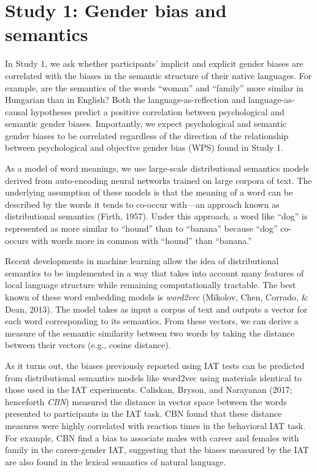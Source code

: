 \documentclass[man]{apa6}
\theoremstyle{definition}
\theoremstyle{definition}
\theoremstyle{definition}
\theoremstyle{remark}
\begin{document}
\section{Study 1: Gender bias and
semantics}\label{study-1-gender-bias-and-semantics}

In Study 1, we ask whether participants' implicit and explicit gender
biases are correlated with the biases in the semantic structure of their
native languages. For example, are the semantics of the words
\enquote{woman} and \enquote{family} more similar in Hungarian than in
English? Both the language-as-reflection and language-as-causal
hypotheses predict a positive correlation between psychological and
semantic gender biases. Importantly, we expect psychological and
semantic gender biases to be correlated regardless of the direction of
the relationship between psychological and objective gender bias (WPS)
found in Study 1.

As a model of word meanings, we use large-scale distributional semantics
models derived from auto-encoding neural networks trained on large
corpora of text. The underlying assumption of these models is that the
meaning of a word can be described by the words it tends to co-occur
with---an approach known as distributional semantics (Firth, 1957).
Under this approach, a word like \enquote{dog} is represented as more
similar to \enquote{hound} than to \enquote{banana} because
\enquote{dog} co-occurs with words more in common with \enquote{hound}
than \enquote{banana.}

Recent developments in machine learning allow the idea of distributional
semantics to be implemented in a way that takes into account many
features of local language structure while remaining computationally
tractable. The best known of these word embedding models is
\emph{word2vec} (Mikolov, Chen, Corrado, \& Dean, 2013). The model takes
as input a corpus of text and outputs a vector for each word
corresponding to its semantics. From these vectors, we can derive a
measure of the semantic similarity between two words by taking the
distance between their vectors (e.g., cosine distance).

As it turns out, the biases previously reported using IAT tests can be
predicted from distributional semantics models like word2vec using
materials identical to those used in the IAT experiments. Caliskan,
Bryson, and Narayanan (2017; henceforth \emph{CBN}) measured the
distance in vector space between the words presented to participants in
the IAT task. CBN found that these distance measures were highly
correlated with reaction times in the behavioral IAT task. For example,
CBN find a bias to associate males with career and females with family
in the career-gender IAT, suggesting that the biases measured by the IAT
are also found in the lexical semantics of natural language.
\end{document}
